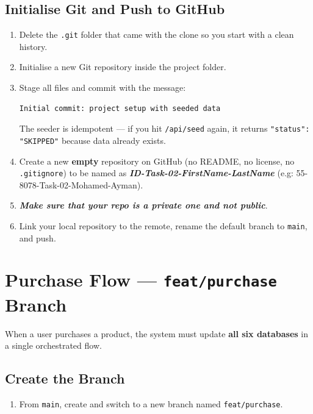 \documentclass[a4paper]{article}
\begin{document}
\subsection*{Initialise Git and Push to GitHub}
\begin{enumerate}
  \item Delete the \texttt{.git} folder that came with the clone so you start with a clean history.
  \item Initialise a new Git repository inside the project folder.
  \item Stage all files and commit with the message:
    \begin{verbatim}
Initial commit: project setup with seeded data
    \end{verbatim}
    The seeder is idempotent --- if you hit \texttt{/api/seed} again, it returns \texttt{"status": "SKIPPED"} because data already exists.
  \item Create a new \textbf{empty} repository on GitHub (no README, no license, no \texttt{.gitignore}) to be named as \textit{\textbf{ID-Task-02-FirstName-LastName}} (e.g: 55-8078-Task-02-Mohamed-Ayman).
  \item \textit{\textbf{Make sure that your repo is a private one and not public}}.
  \item Link your local repository to the remote, rename the default branch to \texttt{main}, and push.
\end{enumerate}

\section{Purchase Flow --- \texttt{feat/purchase} Branch}

\noindent When a user purchases a product, the system must update \textbf{all six databases} in a single orchestrated flow.

\subsection*{Create the Branch}
\begin{enumerate}
  \item From \texttt{main}, create and switch to a new branch named \texttt{feat/purchase}.
\end{enumerate}
\end{document}

